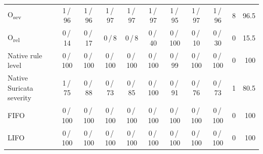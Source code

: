 \begin{tabular}{lccccccccrr}
\midrule
O\textsubscript{sev} & 1\,/\,96 & 1\,/\,96 & 1\,/\,97 & 1\,/\,97 & 1\,/\,97 & 1\,/\,95 & 1\,/\,97 & 1\,/\,96 & 8 & 96.5 \\
O\textsubscript{rel} & 0\,/\,14 & 0\,/\,17 & 0\,/\,8 & 0\,/\,8 & 0\,/\,40 & 0\,/\,100 & 0\,/\,10 & 0\,/\,30 & 0 & 15.5 \\
Native rule level & 0\,/\,100 & 0\,/\,100 & 0\,/\,100 & 0\,/\,100 & 0\,/\,100 & 0\,/\,99 & 0\,/\,100 & 0\,/\,100 & 0 & 100 \\
Native Suricata severity & 1\,/\,75 & 0\,/\,88 & 0\,/\,73 & 0\,/\,85 & 0\,/\,100 & 0\,/\,91 & 0\,/\,76 & 0\,/\,73 & 1 & 80.5 \\
FIFO & 0\,/\,100 & 0\,/\,100 & 0\,/\,100 & 0\,/\,100 & 0\,/\,100 & 0\,/\,100 & 0\,/\,100 & 0\,/\,100 & 0 & 100 \\
LIFO & 0\,/\,100 & 0\,/\,100 & 0\,/\,100 & 0\,/\,100 & 0\,/\,100 & 0\,/\,100 & 0\,/\,100 & 0\,/\,100 & 0 & 100 \\
\bottomrule
\end{tabular}
